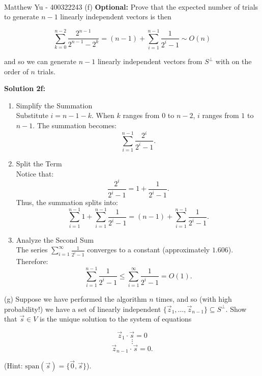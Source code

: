 \documentclass{article}
\begin{document}
\newpage
\begin{question}[title=QUESTION 2f]\\
Matthew Yu - 400322243
(f) \textbf{Optional:} Prove that the expected number of trials to generate \(n-1\) linearly independent vectors is then

\[
\sum_{k=0}^{n-2} \frac{2^{n-1}}{2^{n-1} - 2^{k}} = (n-1) + \sum_{i=1}^{n-1} \frac{1}{2^{i} - 1} \sim O(n)
\]

and so we can generate \(n-1\) linearly independent vectors from \(S^{\perp}\) with on the order of \(n\) trials.
\end{question}

\textbf{Solution 2f:}
\begin{enumerate}
    \item Simplify the Summation\\
    Substitute \( i = n-1 - k \). When \( k \) ranges from \( 0 \) to \( n-2 \), \( i \) ranges from \( 1 \) to \( n-1 \). The summation becomes:
    $$\sum_{i=1}^{n-1} \frac{2^i}{2^i - 1}.$$
    \item Split the Term\\
    Notice that:
    $$\frac{2^i}{2^i - 1} = 1 + \frac{1}{2^i - 1}.$$  
    Thus, the summation splits into:
    $$\sum_{i=1}^{n-1} 1 + \sum_{i=1}^{n-1} \frac{1}{2^i - 1} = (n-1) + \sum_{i=1}^{n-1} \frac{1}{2^i - 1}.$$
    \item Analyze the Second Sum\\
    The series \( \sum_{i=1}^{\infty} \frac{1}{2^i - 1} \) converges to a constant (approximately \( 1.606 \)). Therefore:
    $$\sum_{i=1}^{n-1} \frac{1}{2^i - 1} \leq \sum_{i=1}^{\infty} \frac{1}{2^i - 1} = O(1).$$
\end{enumerate}

\newpage
\begin{question}[title=QUESTION 2g - ]
(g) Suppose we have performed the algorithm \(n\) times, and so (with high probability!) we have a set of linearly independent \(\{\vec{z}_{1}, \ldots, \vec{z}_{n-1}\} \subseteq S^{\perp}\). Show that \(\vec{s} \in V\) is the unique solution to the system of equations

\[
\vec{z}_{1} \cdot \vec{s} = 0
\]
\[
\vdots
\]
\[
\vec{z}_{n-1} \cdot \vec{s} = 0.
\]

(Hint: \(\text{span}(\vec{s}) = \{\vec{0}, \vec{s}\}\)).
\end{question}
\end{document}
